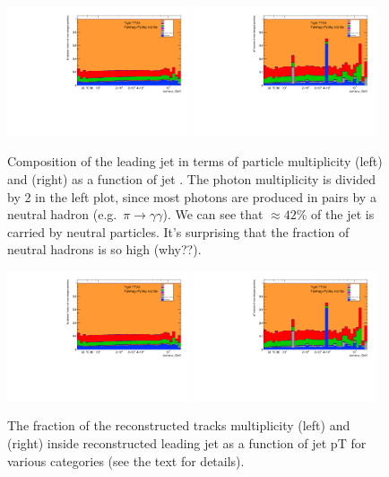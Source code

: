 \begin{figure}[b]
	\centering
	\includegraphics[width=0.48\textwidth,page=3]{figures/jet_comp_study_powheg_Tight_MultiplicityFraction_mc16e.pdf}
	\includegraphics[width=0.48\textwidth,page=3]{figures/jet_comp_study_powheg_Tight_pTFraction_mc16e.pdf}
	\caption{Composition of the leading jet in terms of particle multiplicity (left) and \pt{} (right) as a function of jet \pt{}.
		The photon multiplicity is divided by 2 in the left plot, since most photons are produced in pairs by a neutral hadron (e.g.\ $\pi\to\gamma\gamma$).
		We can see that $\approx 42$\% of the jet \pt{} is carried by neutral particles. It's surprising that the fraction of neutral hadrons is so high (why??).}
	\label{fig:truthJetComp}
\end{figure}


\begin{figure}
\centering
\includegraphics[width=0.48\textwidth,page=1]{figures/jet_comp_study_powheg_Tight_MultiplicityFraction_mc16e.pdf}
\includegraphics[width=0.48\textwidth,page=1]{figures/jet_comp_study_powheg_Tight_pTFraction_mc16e.pdf}
\caption {The fraction of the reconstructed tracks multiplicity (left) and \pT (right) inside reconstructed leading jet as a function of jet pT for various categories (see the text for details).}
\label{fig:fraction of charged particles in reco jet}
\end{figure}


